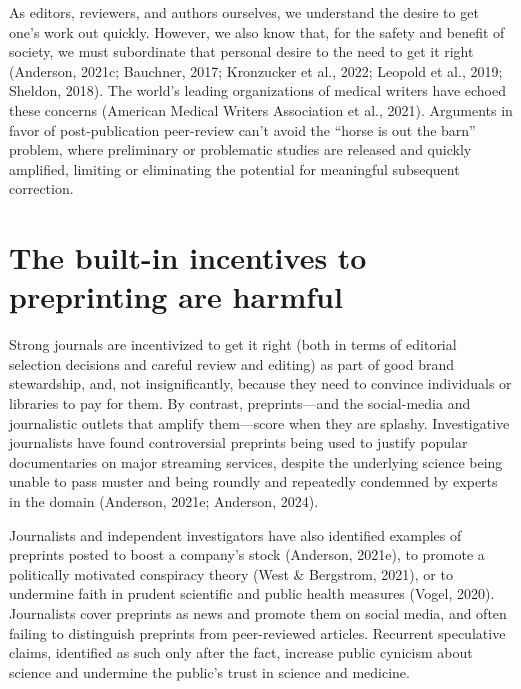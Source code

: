 \documentclass[authordate, empirical]{jote-new-article}
\begin{document}
	As editors, reviewers, and authors ourselves, we understand the desire to get one's work out quickly. However, we also know that, for the safety and benefit of society, we must subordinate that personal desire to the need to get it right (Anderson, 2021c; Bauchner, 2017; Kronzucker et al., 2022; Leopold et al., 2019; Sheldon, 2018). The world's leading organizations of medical writers have echoed these concerns (American Medical Writers Association et al., 2021). Arguments in favor of post-publication peer-review can't avoid the “horse is out the barn” problem, where preliminary or problematic studies are released and quickly amplified, limiting or eliminating the potential for meaningful subsequent correction.







	\section{The built-in incentives to preprinting are harmful}







	Strong journals are incentivized to get it right (both in terms of editorial selection decisions and careful review and editing) as part of good brand stewardship, and, not insignificantly, because they need to convince individuals or libraries to pay for them. By contrast, preprints—and the social-media and journalistic outlets that amplify them—score when they are splashy. Investigative journalists have found controversial preprints being used to justify popular documentaries on major streaming services, despite the underlying science being unable to pass muster and being roundly and repeatedly condemned by experts in the domain (Anderson, 2021e; Anderson, 2024).







	Journalists and independent investigators have also identified examples of preprints posted to boost a company's stock (Anderson, 2021e), to promote a politically motivated conspiracy theory (West \& Bergstrom, 2021), or to undermine faith in prudent scientific and public health measures (Vogel, 2020). Journalists cover preprints as news and promote them on social media, and often failing to distinguish preprints from peer-reviewed articles. Recurrent speculative claims, identified as such only after the fact, increase public cynicism about science and undermine the public's trust in science and medicine.
\end{document}
